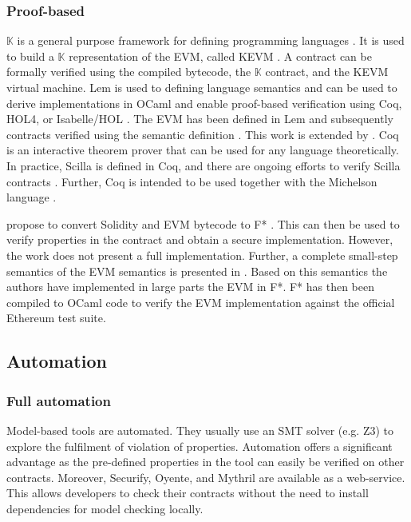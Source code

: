 \subsubsection{Proof-based}
$\mathbb{K}$ is a general purpose framework for defining programming languages \cite{Rosu2007}. It is used to build a $\mathbb{K}$ representation of the EVM, called KEVM \cite{Hildenbrandt2017}. 
A contract can be formally verified using the compiled bytecode, the $\mathbb{K}$ contract, and the KEVM virtual machine. 
Lem is used to defining language semantics and can be used to derive implementations in OCaml and enable proof-based verification using Coq, HOL4, or Isabelle/HOL \cite{Mulligan2014}. The EVM has been defined in Lem and subsequently contracts verified using the semantic definition \cite{Hirai2017}. This work is extended by \cite{Amani2018}. 
Coq is an interactive theorem prover that can be used for any language theoretically. In practice, Scilla is defined in Coq, and there are ongoing efforts to verify Scilla contracts \cite{Sergey2018}. Further, Coq is intended to be used together with the Michelson language \cite{DynamicLedgerSolutions2017}.

\citeauthor{Bhargavan2016} propose to convert Solidity and EVM bytecode to F* \cite{Bhargavan2016}. This can then be used to verify properties in the contract and obtain a secure implementation. However, the work does not present a full implementation.
Further, a complete small-step semantics of the EVM semantics is presented in \cite{Grishchenko2018}. Based on this semantics the authors have implemented in large parts the EVM in F*. F* has then been compiled to OCaml code to verify the EVM implementation against the official Ethereum test suite.

\subsection{Automation} 
\subsubsection{Full automation}
Model-based tools are automated. They usually use an SMT solver (e.g. Z3) to explore the fulfilment of violation of properties. Automation offers a significant advantage as the pre-defined properties in the tool can easily be verified on other contracts. Moreover, Securify, Oyente, and Mythril are available as a web-service. This allows developers to check their contracts without the need to install dependencies for model checking locally.

